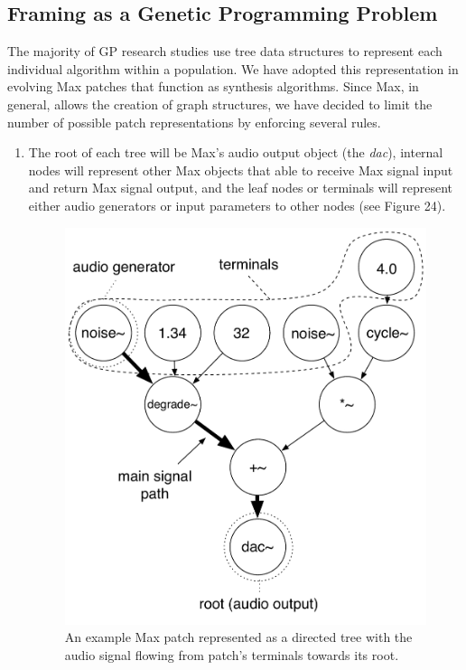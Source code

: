\documentclass[12pt]{report} 	%
\numberwithin{figure}{chapter}
\numberwithin{table}{chapter}
\numberwithin{equation}{chapter}
\begin{document}
\begin{flushleft}
\subsection{Framing as a Genetic Programming Problem}
The majority of GP research studies use tree data structures to represent each individual algorithm within a population. We have adopted this representation in evolving Max patches that function as synthesis algorithms. Since Max, in general, allows the creation of graph structures, we have decided to limit the number of possible patch representations by enforcing several rules. 
\begin{enumerate}
\item The root of each tree will be Max's audio output object (the \textit{dac\texttildelow{}}), internal nodes will represent other Max objects that able to receive Max signal input and return Max signal output, and the leaf nodes or terminals will represent either audio generators or input parameters to other nodes (see Figure 24).
\begin{figure}[h!]
\begin{center}
\includegraphics[scale=0.7]{RootTreeFIg}
\caption[A Max patch as a directed tree]{An example Max patch represented as a directed tree with the audio signal flowing from patch's terminals towards its root.}
\end{center}
\vspace{12pt}
\end{figure}


\end{enumerate}
\end{flushleft}
\end{document}
